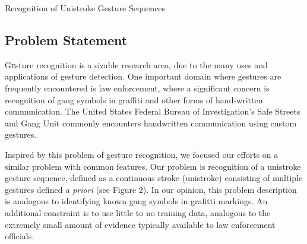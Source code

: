\documentclass[twoside]{article}
\begin{document}
\centerline{Recognition of Unistroke Gesture Sequences}
\normalsize


\begin{multicols}{2} %

\section{Problem Statement}
\lettrine[nindent=0em,lines=2]{G}esture recognition is a sizable research area,
due to the many uses and applications of gesture detection.
One important domain where gestures are frequently encountered is law
enforcement, where a significant concern is recognition of gang symbols in
graffiti and other forms of hand-written communication. The United States
Federal Bureau of Investigation's Safe Streets and Gang Unit commonly encounters
handwritten communication using custom gestures\cite{lyddane_donald_united_2006}. 

Inspired by this problem of gesture recognition, we focused our efforts on a
similar problem with common features. Our problem is recognition of a unistroke
gesture sequence, defined as a continuous stroke (unistroke) consisting of
multiple gestures defined \textit{a priori} (see Figure 2). In our opinion, this
problem description is analogous to identifying known gang symbols in grafitti
markings. An additional constraint is to use little to no training data, analogous to the
extremely small amount of evidence typically available to law enforcement officials.



\end{multicols}
\end{document}
